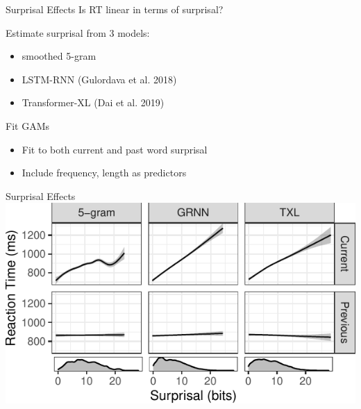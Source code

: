 \documentclass[12pt, xcolor=beamer,table,usenames,dvipsnames, ignorenonframetext, ngerman,t]{beamer}
\begin{document}
\begin{frame}{Surprisal Effects}
\large{Is RT linear in terms of surprisal?}\pause
\medskip

Estimate surprisal from 3 models:
\begin{itemize}
	\item smoothed 5-gram
	\item LSTM-RNN (Gulordava et al. 2018)
	\item Transformer-XL (Dai et al. 2019)
\end{itemize}

\pause

Fit GAMs
\begin{itemize}
	\item Fit to both current and past word surprisal
	\item Include frequency, length as predictors
\end{itemize}

\end{frame}

\begin{frame}{Surprisal Effects}
	\includegraphics[width=.9\textwidth]{../gam.pdf}	
\end{frame}
\end{document}
